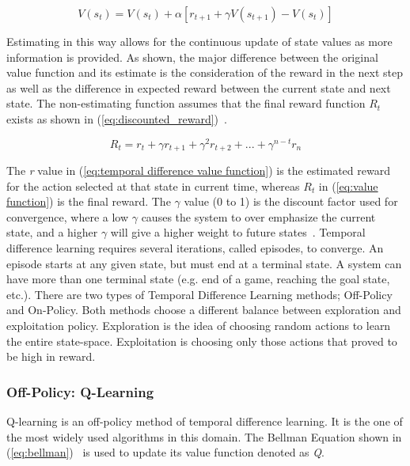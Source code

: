 \documentclass[12pt,american]{report}
\begin{document}
        \begin{equation}
            \label{eq:temporal difference value function}
            V(s_{t}) = V(s_{t}) + \alpha[r_{t+1} + \gamma V(s_{t+1})-V(s_{t})]
        \end{equation}

        Estimating in this way allows for the continuous update of state values as more information is provided. As shown, the major difference between the original value function and its estimate is the consideration of the reward in the next step as well as the difference in expected reward between the current state and next state. The non-estimating function assumes that the final reward function \textit{$R_{t}$} exists as shown in (\ref{eq:discounted_reward})~\cite{matiisen_2015}.

        \begin{equation}
            \label{eq:discounted_reward}
            R_{t} = r_t + \gamma r_{t+1} + \gamma^2 r_{t+2} + ... + \gamma^{n-t}r_n 
        \end{equation}

        The \textit{r} value in (\ref{eq:temporal difference value function}) is the estimated reward for the action selected at that state in current time, whereas \textit{$R_t$} in (\ref{eq:value function}) is the final reward.  The \begin{math}\gamma\end{math} value (0 to 1) is the discount factor used for convergence, where a low \begin{math}\gamma\end{math} causes the system to over emphasize the current state, and a higher \begin{math}\gamma\end{math} will give a higher weight to future states~\cite{Eden}. Temporal difference learning requires several iterations, called episodes, to converge. An episode starts at any given state, but must end at a terminal state.  A system can have more than one terminal state (e.g. end of a game, reaching the goal state, etc.). There are two types of Temporal Difference Learning methods; Off-Policy and On-Policy.  Both methods choose a different balance between exploration and exploitation policy.  Exploration is the idea of choosing random actions to learn the entire state-space.  Exploitation is choosing only those actions that proved to be high in reward.

        
        \subsubsection{Off-Policy: Q-Learning}
        Q-learning is an off-policy method of temporal difference learning. It is the one of the most widely used algorithms in this domain. The Bellman Equation shown in (\ref{eq:bellman})~\cite{matiisen_2015} is used to update its value function denoted as \textit{Q}.
\end{document}
